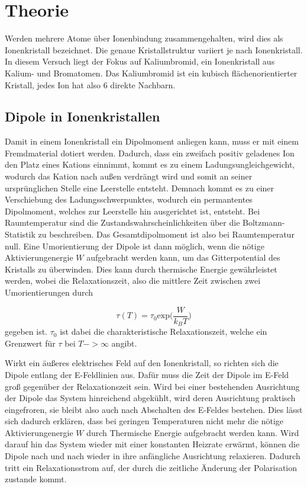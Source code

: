 \section{Theorie}
\label{sec:Theorie}

Werden mehrere Atome über Ionenbindung zusammengehalten, wird dies als Ionenkristall bezeichnet. Die genaue Kristallstruktur variiert je nach Ionenkristall.
In diesem Versuch liegt der Fokus auf Kaliumbromid, ein Ionenkristall aus Kalium- und Bromatomen. Das Kaliumbromid ist ein kubisch flächenorientierter Kristall,
jedes Ion hat also 6 direkte Nachbarn. 

\subsection{Dipole in Ionenkristallen}

Damit in einem Ionenkristall ein Dipolmoment anliegen kann, muss er mit einem Fremdmaterial dotiert werden. Dadurch, dass ein zweifach positiv geladenes Ion den Platz eines 
Kations einnimmt, kommt es zu einem Ladungsungleichgewicht, wodurch das Kation nach außen verdrängt wird und somit an seiner ursprünglichen Stelle eine Leerstelle entsteht.
Demnach kommt es zu einer Verschiebung des Ladungsschwerpunktes, wodurch ein permantentes Dipolmoment, welches zur Leerstelle hin ausgerichtet ist, entsteht. 
Bei Raumtemperatur sind die Zustandswahrscheinlichkeiten über die Boltzmann-Statistik zu beschreiben. Das Gesamtdipolmoment ist also bei Raumtemperatur null. 
Eine Umorientierung der Dipole ist dann möglich, wenn die nötige Aktivierungenergie $W$ aufgebracht werden kann, um das Gitterpotential des Kristalls zu überwinden. 
Dies kann durch thermische Energie gewährleistet werden, wobei die Relaxationszeit, also die mittlere Zeit zwischen zwei Umorientierungen durch 

\begin{equation}
    \tau(T) = \tau_0 \text{exp} \bigl( \frac{W}{k_B T}\bigr)
\end{equation}
gegeben ist. $\tau_0 $ ist dabei die charakteristische Relaxationszeit, welche ein Grenzwert für $\tau$ bei $T -> \infty$ angibt.

Wirkt ein äußeres elektrisches Feld auf den Ionenkristall, so richten sich die Dipole entlang der E-Feldlinien aus. Dafür muss die Zeit der Dipole im E-Feld 
groß gegenüber der Relaxationszeit sein. Wird bei einer bestehenden Ausrichtung der Dipole das System hinreichend abgekühlt, wird deren Ausrichtung praktisch eingefroren, sie bleibt 
also auch nach Abschalten des E-Feldes bestehen. Dies lässt sich dadurch erklären, dass bei geringen Temperaturen nicht mehr die nötige Aktivierungenergie $W$ durch Thermische Energie 
aufgebracht werden kann. Wird darauf hin das System wieder mit einer konstanten Heizrate erwärmt, können die Dipole nach und nach wieder in ihre anfängliche Ausrichtung relaxieren. 
Dadurch tritt ein Relaxationsstrom auf, der durch die zeitliche Änderung der Polarisation zustande kommt.

